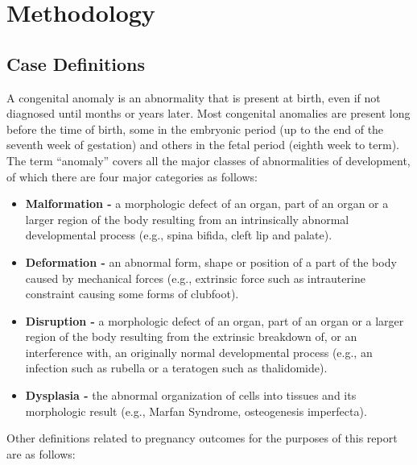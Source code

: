 \documentclass[
]{krantz}
\begin{document}
\mainmatter

\hypertarget{chapter-1}{%
\chapter{Methodology}\label{chapter-1}}

\hypertarget{section-11}{%
\section{Case Definitions}\label{section-11}}

A congenital anomaly is an abnormality that is present at birth, even if not diagnosed until months or years later. Most congenital anomalies are present long before the time of birth, some in the embryonic period (up to the end of the seventh week of gestation) and others in the fetal period (eighth week to term). The term ``anomaly'' covers all the major classes of abnormalities of development, of which there are four major categories as follows:

\begin{itemize}
\item
  \textbf{Malformation -} a morphologic defect of an organ, part of an organ or a larger region of the body resulting from an intrinsically abnormal developmental process (e.g., spina bifida, cleft lip and palate).
\item
  \textbf{Deformation -} an abnormal form, shape or position of a part of the body caused by mechanical forces (e.g., extrinsic force such as intrauterine constraint causing some forms of clubfoot).
\item
  \textbf{Disruption -} a morphologic defect of an organ, part of an organ or a larger region of the body resulting from the extrinsic breakdown of, or an interference with, an originally normal developmental process (e.g., an infection such as rubella or a teratogen such as thalidomide).
\item
  \textbf{Dysplasia -} the abnormal organization of cells into tissues and its morphologic result (e.g., Marfan Syndrome, osteogenesis imperfecta).
\end{itemize}

Other definitions related to pregnancy outcomes for the purposes of this report are as follows:
\end{document}
